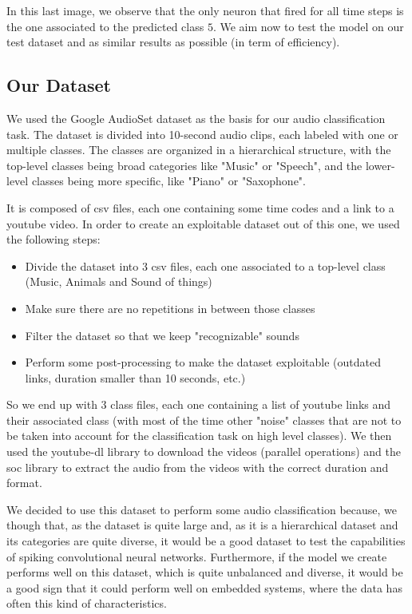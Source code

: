 \documentclass[11pt]{article}
\begin{document}
In this last image, we observe that the only neuron that fired for all time steps is the one associated to the predicted class $5$. We aim now to test the model on our test dataset and as similar results as possible (in term of efficiency).

\subsection{Our Dataset}

We used the Google AudioSet dataset as the basis for our audio classification task. The dataset is divided into 10-second audio clips, each labeled with one or multiple classes. The classes are organized in a hierarchical structure, with the top-level classes being broad categories like "Music" or "Speech", and the lower-level classes being more specific, like "Piano" or "Saxophone".

It is composed of csv files, each one containing some time codes and a link to a youtube video. In order to create an exploitable dataset out of this one, we used the following steps:

\begin{itemize}
  \item Divide the dataset into 3 csv files, each one associated to a top-level class (Music, Animals and Sound of things)
  \item Make sure there are no repetitions in between those classes 
  \item Filter the dataset so that we keep "recognizable" sounds
  \item Perform some post-processing to make the dataset exploitable (outdated links, duration smaller than 10 seconds, etc.)
\end{itemize}

So we end up with 3 class files, each one containing a list of youtube links and their associated class (with most of the time other "noise" classes that are not to be taken into account for the classification task on high level classes). We then used the youtube-dl library to download the videos (parallel operations) and the soc library to extract the audio from the videos with the correct duration and format. 

We decided to use this dataset to perform some audio classification because, we though that, as the dataset is quite large and, as it is a hierarchical dataset and its categories are quite diverse, it would be a good dataset to test the capabilities of spiking convolutional neural networks.
Furthermore, if the model we create performs well on this dataset, which is quite unbalanced and diverse, it would be a good sign that it could perform well on embedded systems, where the data has often this kind of characteristics.
\end{document}

